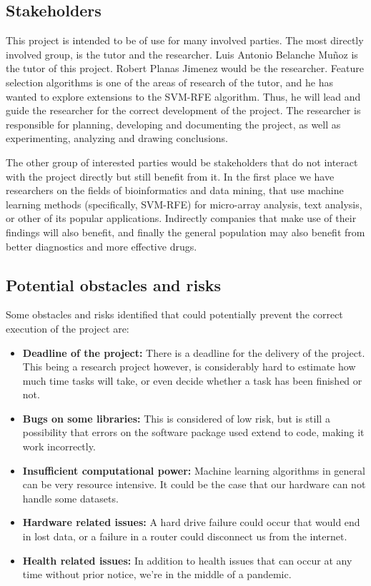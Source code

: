 
\subsection{Stakeholders}

This project is intended to be of use for many involved parties. The most directly involved group, is the tutor and the researcher. Luis Antonio Belanche Muñoz is the tutor of this project. Robert Planas Jimenez would be the researcher. Feature selection algorithms is one of the areas of research of the tutor, and he has wanted to explore extensions to the SVM-RFE algorithm. Thus, he will lead and guide the researcher for the correct development of the project. The researcher is responsible for planning, developing and documenting the project, as well as experimenting, analyzing and drawing conclusions.

The other group of interested parties would be stakeholders that do not interact with the project directly but still benefit from it. In the first place we have researchers on the fields of bioinformatics and data mining, that use machine learning methods (specifically, SVM-RFE) for micro-array analysis, text analysis, or other of its popular applications. Indirectly companies that make use of their findings will also benefit, and finally the general population may also benefit from better diagnostics and more effective drugs. 

\label{sec:risk}
\subsection{Potential obstacles and risks}

Some obstacles and risks identified that could potentially prevent the correct exec\-ution of the project are:

\begin{itemize}
    \item \textbf{Deadline of the project:} There is a deadline for the delivery of the project. This being a research project however, is considerably hard to estimate how much time tasks will take, or even decide whether a task has been finished or not.
    \item \textbf{Bugs on some libraries:} This is considered of low risk, but is still a possibility that errors on the software package used extend to code, making it work in\-correctly.
    \item \textbf{Insufficient computational power:} Machine learning algorithms in general can be very resource intensive. It could be the case that our hardware can not handle some datasets. 
    \item \textbf{Hardware related issues:} A hard drive failure could occur that would end in lost data, or a failure in a router could disconnect us from the internet.
    \item \textbf{Health related issues:} In addition to health issues that can occur at any time without prior notice, we're in the middle of a pandemic.
\end{itemize}


